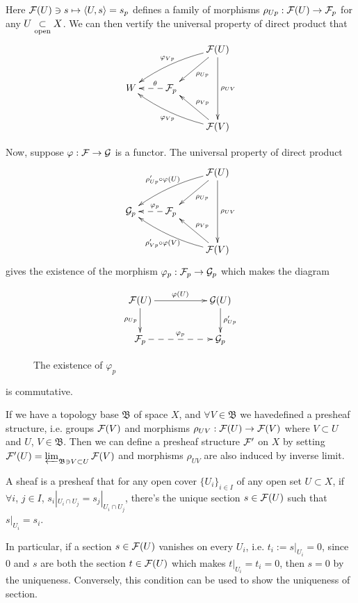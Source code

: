 \documentclass[10pt]{extbook}
\begin{document}
Here $\mathcal{F}(U)\ni s\mapsto \langle U,s\rangle=s_p$ defines a family of morphisms 
$\rho_{Up}:\mathcal{F}(U)\to \mathcal{F}_p$ for any $U\underset{\mathrm{open}}{\subset} X$. We can then vertify the 
universal property of direct product that
\[
	\xymatrix{
	&&\ar[dl]^{\rho_{Up}}\calf(U)\ar[dd]^{\rho_{UV}}\ar@/_/[lld]_{\varphi_{Vp}} \\
	W&\ar@{-->}[l]_(0.4){\theta}\calf_p&\\
	&&\ar[ul]_{\rho_{Vp}}\calf(V)\ar@/^/[llu]^{\varphi_{Vp}}
	}
\]

Now, suppose $\varphi:\mathcal{F} \to \mathcal{G}$ is a functor. The universal property of direct product 
\[
	\xymatrix{
		&&\ar[dl]^{\rho_{Up}}\calf(U)\ar[dd]^{\rho_{UV}}\ar@/_/[lld]_{\rho'_{Up}\circ\varphi(U)} \\
		\calg_p&\ar@{-->}[l]_(0.4){\varphi_p}\calf_p&\\
		&&\ar[ul]_{\rho_{Vp}}\calf(V)\ar@/^/[llu]^{\rho'_{Vp}\circ\varphi(V)}
	}
\]
gives the existence of the morphism $\varphi_p:\mathcal{F}_p\to \mathcal{G}_p$ which makes the diagram
\begin{figure}[h]
\[
	\xymatrix{
		\calf(U)\ar[rr]^{\varphi(U)} \ar[d]_{\rho_{Up}}&&\calg(U) \ar[d]^{\rho'_{Up}}\\
		\calf_p\ar@{-->}[rr]^{\varphi_p}&&\calg_p
	}
\]
\caption{The existence of $\varphi_p$}
\label{fig1}
\end{figure}

\noindent is commutative.

\para \label{base} If we have a topology base $\mathfrak{B}$ of space $X$, and 
$\forall V\in \mathfrak{B}$ we havedefined a presheaf structure, i.e. groups $\mathcal{F}(V)$ and 
morphisms $\rho_{UV}:\mathcal{F}(U)\to \mathcal{F}(V)$ where $V\subset U$ and $U$, $V\in \mathfrak{B}$. 
Then we can define a presheaf structure $\mathcal{F}'$ on $X$ by setting
$\mathcal{F}'(U)=\varprojlim_{\mathfrak{B}\ni V \subset U} \mathcal{F}(V)$ and morphisms $\rho_{UV}$ are
also induced by inverse limit.

\para A sheaf is a presheaf that for any open cover $\{U_i\}_{i\in I}$ of any open set $U\subset X$, 
if $\forall i$, $j\in I$, $s_i|_{U_i\cap U_j}=s_j|_{U_i\cap U_j}$, there's the unique section 
$s\in\mathcal{F}(U)$ such that $s|_{U_i}=s_i$.

In particular, if a section $s\in \mathcal{F}(U)$ vanishes on every $U_i$, i.e. $t_i:=s|_{U_i}=0$, since 
$0$ and $s$ are both the section $t\in \mathcal{F}(U)$ which makes $t|_{U_i}=t_i=0$, then $s=0$ by the uniqueness. Conversely, this condition can be used to show the uniqueness of section.  

\end{document}
